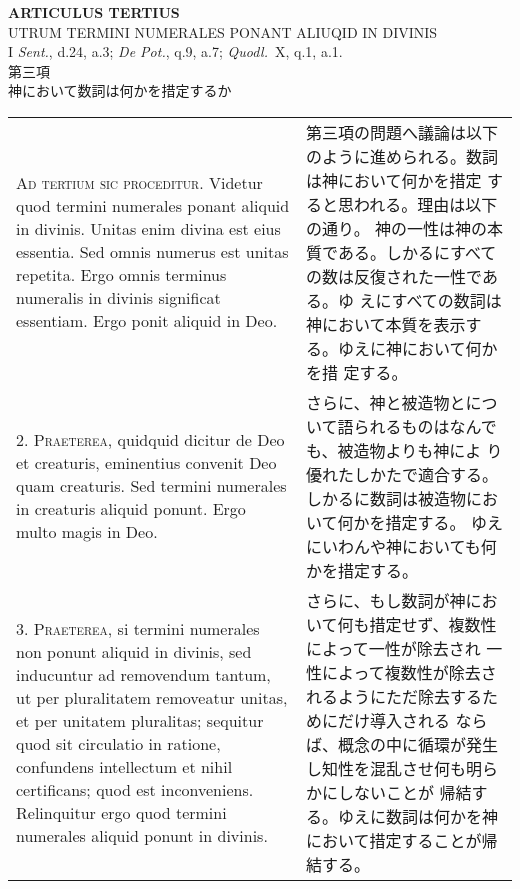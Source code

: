 \documentclass[10pt]{jsarticle} %
\begin{document}
\begin{center}
{\Large {\bf ARTICULUS TERTIUS}}\\
{\large UTRUM TERMINI NUMERALES PONANT ALIUQID IN DIVINIS}\\
{\footnotesize I {\itshape Sent.}, d.24, a.3; {\itshape De Pot.}, q.9,
 a.7; {\itshape Quodl.}~X, q.1, a.1.}\\
{\Large 第三項\\神において数詞は何かを措定するか}
\end{center}

\begin{longtable}{p{21em}p{21em}}
{\scshape Ad tertium sic proceditur}. Videtur quod termini numerales ponant
aliquid in divinis. Unitas enim divina est eius essentia. Sed omnis
numerus est unitas repetita. Ergo omnis terminus numeralis in divinis
significat essentiam. Ergo ponit aliquid in Deo.

&

第三項の問題へ議論は以下のように進められる。数詞は神において何かを措定
 すると思われる。理由は以下の通り。
神の一性は神の本質である。しかるにすべての数は反復された一性である。ゆ
 えにすべての数詞は神において本質を表示する。ゆえに神において何かを措
 定する。

\\



2. {\scshape Praeterea}, quidquid dicitur de Deo et creaturis, eminentius convenit
Deo quam creaturis. Sed termini numerales in creaturis aliquid
ponunt. Ergo multo magis in Deo.

&

さらに、神と被造物とについて語られるものはなんでも、被造物よりも神によ
 り優れたしかたで適合する。しかるに数詞は被造物において何かを措定する。
 ゆえにいわんや神においても何かを措定する。

\\



3. {\scshape Praeterea}, si termini numerales non ponunt aliquid in divinis, sed
inducuntur ad removendum tantum, ut per pluralitatem removeatur
unitas, et per unitatem pluralitas; sequitur quod sit circulatio in
ratione, confundens intellectum et nihil certificans; quod est
inconveniens. Relinquitur ergo quod termini numerales aliquid ponunt
in divinis.

&

さらに、もし数詞が神において何も措定せず、複数性によって一性が除去され
 一性によって複数性が除去されるようにただ除去するためにだけ導入される
 ならば、概念の中に循環が発生し知性を混乱させ何も明らかにしないことが
 帰結する。ゆえに数詞は何かを神において措定することが帰結する。



\end{longtable}
\end{document}
